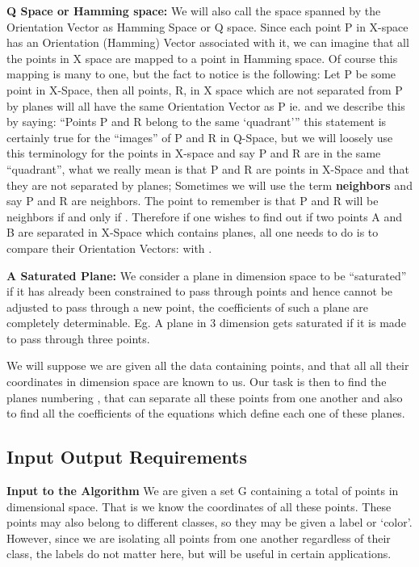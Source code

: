 \documentclass[english]{article}
\begin{document}
\textbf{Q Space or Hamming space: }We will also call the space spanned
by the Orientation Vector as Hamming Space or Q space. Since each
point P in X-space has an Orientation (Hamming) Vector associated
with it, we can imagine that all the points in X space are mapped
to a point in Hamming space. Of course this mapping is many to one,
but the fact to notice is the following: Let P be some point in X-Space,
then all points, R, in X space which are not separated from P by planes
will all have the same Orientation Vector as P ie. 
and we describe this by saying: {}``Points P and R belong to the
same `quadrant''' this statement is certainly true for the {}``images''
of P and R in Q-Space, but we will loosely use this terminology for
the points in X-space and say P and R are in the same {}``quadrant'',
what we really mean is that P and R are points in X-Space and that
they are not separated by planes; Sometimes we will use the term \textbf{neighbors}
and say P and R are neighbors. The point to remember is that P and
R will be neighbors if and only if . Therefore if one
wishes to find out if two points A and B are separated in X-Space
which contains planes, all one needs to do is to compare their Orientation
Vectors:  with .

\textbf{A Saturated Plane:} We consider a plane in  dimension
space to be {}``saturated'' if it has already been constrained to
pass through  points and hence cannot be adjusted to pass through
a new point, the coefficients of such a plane are completely determinable.
Eg. A plane in 3 dimension gets saturated if it is made to pass through
three points.

We will suppose we are given all the data containing  points, and that all 
all their coordinates in  dimension space are known to us. Our task is then to find the planes numbering , that can separate all these points from one another and also to find all the coefficients of the equations which define each one of these planes.

\subsection{Input Output Requirements}

\textbf{Input to the Algorithm} We are given a set G containing a
total of  points in  dimensional space. That is we know
the coordinates of all these points. These points may also belong
to different classes, so they may be given a label or `color'. However,
since we are isolating all points from one another regardless of their
class, the labels do not matter here, but will be useful in certain
applications.
\end{document}

